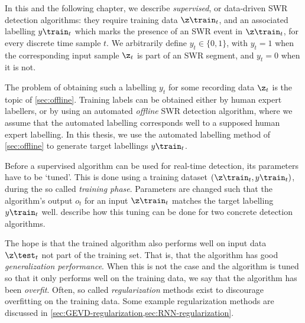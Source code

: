 \label{sec:data-driven-algorithms}

In this and the following chapter, we describe \emph{supervised}, or data-driven SWR detection algorithms: they require training data $\z\train_t$, and an associated labelling $y\train_t$ which marks the presence of an SWR event in $\z\train_t$, for every discrete time sample $t$. We arbitrarily define $y_t \in \{0, 1\}$, with $y_t = 1$ when the corresponding input sample $\z_t$ is part of an SWR segment, and $y_t = 0$ when it is not.

The problem of obtaining such a labelling $y_t$ for some recording data $\z_t$ is the topic of \cref{sec:offline}. Training labels can be obtained either by human expert labellers, or by using an automated \emph{offline} SWR detection algorithm, where we assume that the automated labelling corresponds well to a supposed human expert labelling. In this thesis, we use the automated labelling method of \cref{sec:offline} to generate target labellings $y\train_t$.

Before a supervised algorithm can be used for real-time detection, its parameters have to be `tuned'. This is done using a training dataset $(\z\train_t, y\train_t)$, during the so called \emph{training phase}. Parameters are changed such that the algorithm's output $o_t$ for an input $\z\train_t$ matches the target labelling $y\train_t$ well.  describe how this tuning can be done for two concrete detection algorithms.

The hope is that the trained algorithm also performs well on input data $\z\test_t$ not part of the training set. That is, that the algorithm has good \emph{generalization performance}. When this is not the case and the algorithm is tuned so that it only performs well on the training data, we say that the algorithm has been \emph{overfit}. Often, so called \emph{regularization} methods exist to discourage overfitting on the training data. Some example regularization methods are discussed in \cref{sec:GEVD-regularization,sec:RNN-regularization}.
